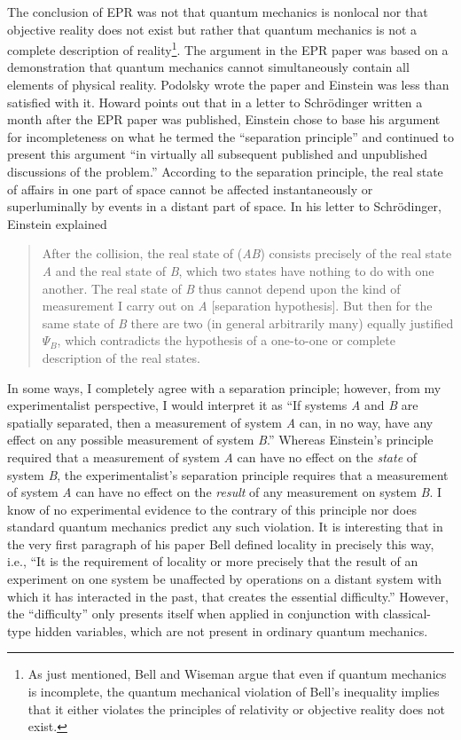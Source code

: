 \documentclass[12pt]{article}
\begin{document}
The conclusion of EPR was not that quantum mechanics is nonlocal nor that objective reality does not exist but rather that quantum mechanics is not a complete description of reality\footnote{ As just mentioned, Bell and Wiseman argue that even if quantum mechanics is incomplete, the quantum mechanical violation of Bell's inequality implies that it either violates the principles of relativity or objective reality does not exist.}. The argument in the EPR paper was based on a demonstration that quantum mechanics cannot simultaneously contain all elements of physical reality. Podolsky wrote the paper and Einstein was less than satisfied with it. Howard\cite{How07} points out that in a letter to Schr\"{o}dinger written a month after the EPR paper was published, Einstein chose to base his argument for incompleteness on what he termed the ``separation principle'' and continued to present this argument ``in virtually all subsequent published and
unpublished discussions of the problem.''\cite{How07}  According to the separation principle, the real state of affairs in one part of space cannot be affected instantaneously or superluminally by events in a distant part of space. In his letter to Schr\"{o}dinger, Einstein explained\cite{How07}
\begin{quote}
After the collision, the real state of ({\it AB}) consists precisely of the real state {\it A} and the real state of {\it B}, which two states have nothing to do with one another. The real state of {\it B} thus cannot depend upon the kind of measurement I carry out on {\it A} [separation hypothesis]. But then for the same state of {\it B} there are two (in general arbitrarily many) equally justified $\Psi_B$, which contradicts the hypothesis of a one-to-one or complete description of the real states.
\end{quote}

In some ways, I completely agree with a separation principle; however, from my experimentalist perspective, I would interpret it as ``If systems {\it A} and {\it B} are spatially separated, then a measurement of system {\it A} can, in no way, have any effect on any possible measurement of system {\it B}.'' Whereas Einstein's principle required that a measurement of system {\it A} can have no effect on the {\it state} of system {\it B}, the experimentalist's separation principle requires that a measurement of system {\it A} can have no effect on the {\it result} of any measurement on system {\it B}.  I know of no experimental evidence to the contrary of this principle nor does standard quantum mechanics predict any such violation. It is interesting that in the very first paragraph of his paper Bell defined locality in precisely this way, i.e., ``It is the requirement of locality or more precisely that the result of an experiment on one system be unaffected by operations on a distant system with which it has interacted in the past, that creates the essential difficulty.''\cite{Bel64} However, the ``difficulty'' only presents itself when applied in conjunction with classical-type hidden variables, which are not present in ordinary quantum mechanics.
\end{document}
